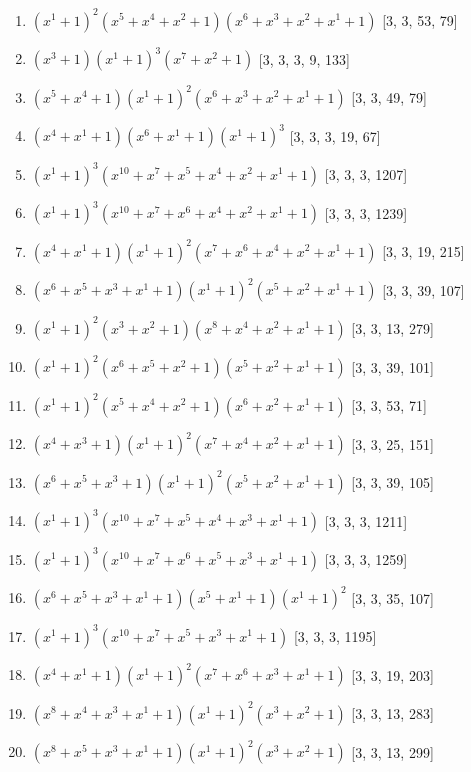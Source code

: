 \documentclass[10pt,twocolumn]{article}
\begin{document}
\begin{enumerate}
\item $(x^{1} + 1)^{2}(x^{5} + x^{4} + x^{2} + 1)(x^{6} + x^{3} + x^{2} + x^{1} + 1)$  [3, 3, 53, 79]
\item $(x^{3} + 1)(x^{1} + 1)^{3}(x^{7} + x^{2} + 1)$  [3, 3, 3, 9, 133]
\item $(x^{5} + x^{4} + 1)(x^{1} + 1)^{2}(x^{6} + x^{3} + x^{2} + x^{1} + 1)$  [3, 3, 49, 79]
\item $(x^{4} + x^{1} + 1)(x^{6} + x^{1} + 1)(x^{1} + 1)^{3}$  [3, 3, 3, 19, 67]
\item $(x^{1} + 1)^{3}(x^{10} + x^{7} + x^{5} + x^{4} + x^{2} + x^{1} + 1)$  [3, 3, 3, 1207]
\item $(x^{1} + 1)^{3}(x^{10} + x^{7} + x^{6} + x^{4} + x^{2} + x^{1} + 1)$  [3, 3, 3, 1239]
\item $(x^{4} + x^{1} + 1)(x^{1} + 1)^{2}(x^{7} + x^{6} + x^{4} + x^{2} + x^{1} + 1)$  [3, 3, 19, 215]
\item $(x^{6} + x^{5} + x^{3} + x^{1} + 1)(x^{1} + 1)^{2}(x^{5} + x^{2} + x^{1} + 1)$  [3, 3, 39, 107]
\item $(x^{1} + 1)^{2}(x^{3} + x^{2} + 1)(x^{8} + x^{4} + x^{2} + x^{1} + 1)$  [3, 3, 13, 279]
\item $(x^{1} + 1)^{2}(x^{6} + x^{5} + x^{2} + 1)(x^{5} + x^{2} + x^{1} + 1)$  [3, 3, 39, 101]
\item $(x^{1} + 1)^{2}(x^{5} + x^{4} + x^{2} + 1)(x^{6} + x^{2} + x^{1} + 1)$  [3, 3, 53, 71]
\item $(x^{4} + x^{3} + 1)(x^{1} + 1)^{2}(x^{7} + x^{4} + x^{2} + x^{1} + 1)$  [3, 3, 25, 151]
\item $(x^{6} + x^{5} + x^{3} + 1)(x^{1} + 1)^{2}(x^{5} + x^{2} + x^{1} + 1)$  [3, 3, 39, 105]
\item $(x^{1} + 1)^{3}(x^{10} + x^{7} + x^{5} + x^{4} + x^{3} + x^{1} + 1)$  [3, 3, 3, 1211]
\item $(x^{1} + 1)^{3}(x^{10} + x^{7} + x^{6} + x^{5} + x^{3} + x^{1} + 1)$  [3, 3, 3, 1259]
\item $(x^{6} + x^{5} + x^{3} + x^{1} + 1)(x^{5} + x^{1} + 1)(x^{1} + 1)^{2}$  [3, 3, 35, 107]
\item $(x^{1} + 1)^{3}(x^{10} + x^{7} + x^{5} + x^{3} + x^{1} + 1)$  [3, 3, 3, 1195]
\item $(x^{4} + x^{1} + 1)(x^{1} + 1)^{2}(x^{7} + x^{6} + x^{3} + x^{1} + 1)$  [3, 3, 19, 203]
\item $(x^{8} + x^{4} + x^{3} + x^{1} + 1)(x^{1} + 1)^{2}(x^{3} + x^{2} + 1)$  [3, 3, 13, 283]
\item $(x^{8} + x^{5} + x^{3} + x^{1} + 1)(x^{1} + 1)^{2}(x^{3} + x^{2} + 1)$  [3, 3, 13, 299]

\end{enumerate}
\end{document}
